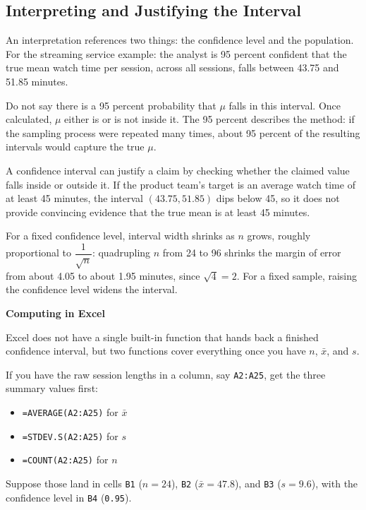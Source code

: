 \subsection{Interpreting and Justifying the Interval}
 
An interpretation references two things: the confidence level and the population. For the streaming service example: the analyst is 95 percent confident that the true mean watch time per session, across all sessions, falls between 43.75 and 51.85 minutes.

Do not say there is a 95 percent probability that $\mu$ falls in this interval. Once calculated, $\mu$ either is or is not inside it. The 95 percent describes the method: if the sampling process were repeated many times, about 95 percent of the resulting intervals would capture the true $\mu$.

A confidence interval can justify a claim by checking whether the claimed value falls inside or outside it. If the product team's target is an average watch time of at least 45 minutes, the interval $(43.75, 51.85)$ dips below 45, so it does not provide convincing evidence that the true mean is at least 45 minutes.

For a fixed confidence level, interval width shrinks as $n$ grows, roughly proportional to $\dfrac{1}{\sqrt{n}}$: quadrupling $n$ from 24 to 96 shrinks the margin of error from about 4.05 to about 1.95 minutes, since $\sqrt{4}=2$. For a fixed sample, raising the confidence level widens the interval.
 
\textbf{Computing in Excel}
 
Excel does not have a single built-in function that hands back a finished confidence interval, but two functions cover everything once you have $n$, $\bar{x}$, and $s$.
 
If you have the raw session lengths in a column, say \texttt{A2:A25}, get the three summary values first:
\begin{itemize}
    \item \texttt{=AVERAGE(A2:A25)} for $\bar{x}$
    \item \texttt{=STDEV.S(A2:A25)} for $s$
    \item \texttt{=COUNT(A2:A25)} for $n$
\end{itemize}
 
Suppose those land in cells \texttt{B1} ($n = 24$), \texttt{B2} ($\bar{x} = 47.8$), and \texttt{B3} ($s = 9.6$), with the confidence level in \texttt{B4} (\texttt{0.95}).
 
